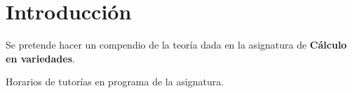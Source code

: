 \chapter*{Introducción}

Se pretende hacer un compendio de la teoría dada en la asignatura de
\textbf{Cálculo en variedades}.

Horarios de tutorías en programa de la asignatura. 